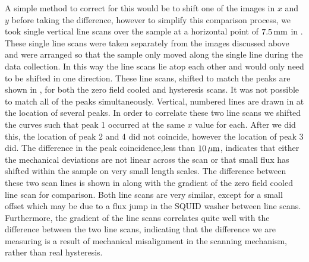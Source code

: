 A simple method to correct for this would be to shift one of the 
images in $x$ and $y$ before taking the difference, however
to simplify this comparison process, we took single vertical line scans over 
the sample at a horizontal point of $7.5\,\mathrm{mm}$ in .
These single line scans were taken separately from the images discussed
above and were arranged so that the sample only moved along the single 
line during the data collection. In this way the line scans lie atop
each other and would only need to be shifted in one direction. 
These line scans, shifted to match the peaks 
are shown in , 
for both the zero field cooled and hysteresis scans. 
It was not possible to match all of the peaks simultaneously. 
Vertical, numbered lines are drawn in 
at the location of several peaks. In order to correlate these two
line scans we shifted the curves such that peak 1 occurred at the same
$x$ value for each. After we did this, the location of peak 2 and 4
did not coincide, however the location of peak 3 did. The difference
in the peak coincidence,less than $10\,\mu\mathrm{m}$,  indicates that either 
the mechanical deviations are not linear across the scan or that
small flux has shifted within the sample on very small length scales. 
The difference 
between these two scan lines is shown in 
along with the gradient of the zero field cooled line scan for 
comparison. Both line scans are very similar, except for a 
small offset which may be due to a flux jump in the SQUID washer
between line scans.
Furthermore, the gradient of the line scans correlates quite
well with the difference between the two line scans, 
indicating that the difference we are 
measuring is a result of mechanical misalignment in the scanning 
mechanism, rather than real hysteresis. 

